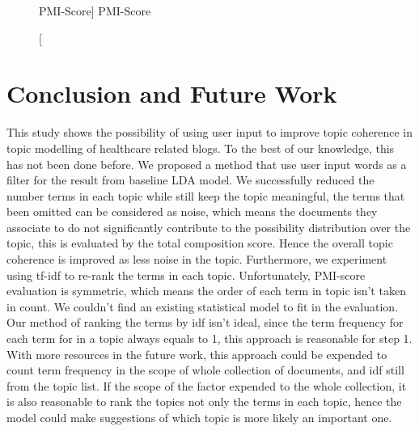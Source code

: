 \documentclass[11pt,twoside]{report}
\begin{document}
\begin{figure}[tp]
    \begin{center}
    \caption
    [PMI-Score]
    {
    PMI-Score
    \label{Figure5}
    }
    \end{center}
\end{figure}

\chapter{Conclusion and Future Work}
This study shows the possibility of using user input to improve topic coherence in topic modelling of healthcare related blogs. To the best of our knowledge, this has not been done before. We proposed a method that use user input words as a filter for the result from baseline LDA model. We successfully reduced the number terms in each topic while still keep the topic meaningful, the terms that been omitted can be considered as noise, which means the documents they associate to do not significantly contribute to the possibility distribution over the topic, this is evaluated by the total composition score. Hence the overall topic coherence is improved as less noise in the topic. Furthermore, we experiment using tf-idf to re-rank the terms in each topic. Unfortunately, PMI-score evaluation is symmetric, which means the order of each term in topic isn't taken in count. We couldn't find an existing statistical model to fit in the evaluation. 
Our method of ranking the terms by idf isn't ideal, since the term frequency for each term for in a topic always equals to 1, this approach is reasonable for step 1. With more resources in the future work, this approach could be expended to count term frequency in the scope of whole collection of documents, and idf still from the topic list. If the scope of the factor expended to the whole collection, it is also reasonable to rank the topics not only the terms in each topic, hence the model could make suggestions of which topic is more likely an important one.




\end{document}
